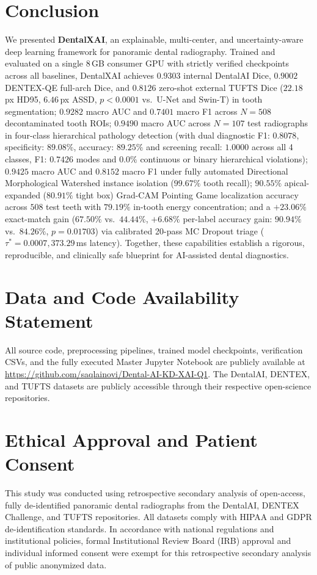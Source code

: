 \documentclass[review]{elsarticle}
\begin{document}
\section{Conclusion}
\label{sec:conclusion}
We presented \textbf{DentalXAI}, an explainable, multi-center, and uncertainty-aware deep learning framework for panoramic dental radiography. Trained and evaluated on a single 8\,GB consumer GPU with strictly verified checkpoints across all baselines, DentalXAI achieves $0.9303$ internal DentalAI Dice, $0.9002$ DENTEX-QE full-arch Dice, and $0.8126$ zero-shot external TUFTS Dice ($22.18$\,px HD95, $6.46$\,px ASSD, $p < 0.0001$ vs.\ U-Net and Swin-T) in tooth segmentation; $0.9282$ macro AUC and $0.7401$ macro F1 across $N=508$ decontaminated tooth ROIs; $0.9490$ macro AUC across $N=107$ test radiographs in four-class hierarchical pathology detection (with dual diagnostic F1: $0.8078$, specificity: $89.08\%$, accuracy: $89.25\%$ and screening recall: $1.0000$ across all 4 classes, F1: $0.7426$ modes and $0.0\%$ continuous or binary hierarchical violations); $0.9425$ macro AUC and $0.8152$ macro F1 under fully automated Directional Morphological Watershed instance isolation ($99.67\%$ tooth recall); $90.55\%$ apical-expanded ($80.91\%$ tight box) Grad-CAM Pointing Game localization accuracy across $508$ test teeth with $79.19\%$ in-tooth energy concentration; and a $+23.06\%$ exact-match gain ($67.50\%$ vs.\ $44.44\%$, $+6.68\%$ per-label accuracy gain: $90.94\%$ vs.\ $84.26\%$, $p = 0.01703$) via calibrated 20-pass MC Dropout triage ($\tau^* = 0.0007, 373.29$\,ms latency). Together, these capabilities establish a rigorous, reproducible, and clinically safe blueprint for AI-assisted dental diagnostics.

\section*{Data and Code Availability Statement}
All source code, preprocessing pipelines, trained model checkpoints, verification CSVs, and the fully executed Master Jupyter Notebook are publicly available at \url{https://github.com/saqlainovi/Dental-AI-KD-XAI-Q1}. The DentalAI, DENTEX, and TUFTS datasets are publicly accessible through their respective open-science repositories.

\section*{Ethical Approval and Patient Consent}
This study was conducted using retrospective secondary analysis of open-access, fully de-identified panoramic dental radiographs from the DentalAI, DENTEX Challenge, and TUFTS repositories. All datasets comply with HIPAA and GDPR de-identification standards. In accordance with national regulations and institutional policies, formal Institutional Review Board (IRB) approval and individual informed consent were exempt for this retrospective secondary analysis of public anonymized data.
\end{document}
